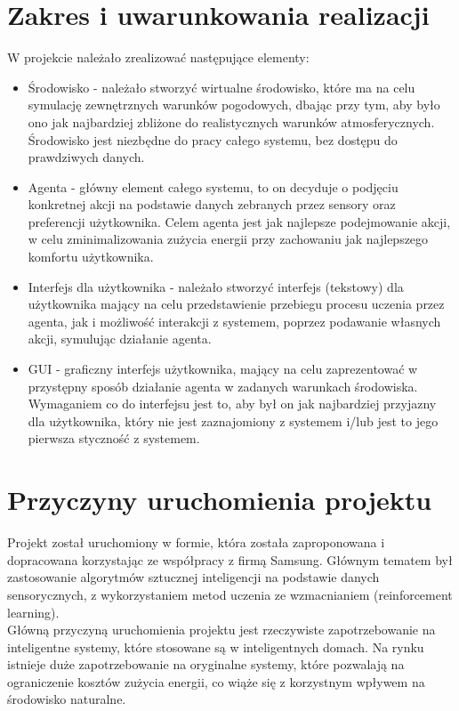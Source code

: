 \documentclass{article}
\begin{document}
\section{Zakres i uwarunkowania realizacji}
W projekcie należało zrealizować następujące elementy:
\begin{itemize}
\item Środowisko - należało stworzyć wirtualne środowisko, które ma na celu symulację zewnętrznych warunków pogodowych, dbając przy tym, aby było ono jak najbardziej zbliżone do realistycznych warunków atmosferycznych. Środowisko jest niezbędne do pracy całego systemu, bez dostępu do prawdziwych danych.
\item Agenta - główny element całego systemu, to on decyduje o podjęciu konkretnej akcji na podstawie danych zebranych przez sensory oraz preferencji użytkownika. Celem agenta jest jak najlepsze podejmowanie akcji, w celu zminimalizowania zużycia energii przy zachowaniu jak najlepszego komfortu użytkownika.
\item Interfejs dla użytkownika  - należało stworzyć interfejs (tekstowy) dla użytkownika mający na celu przedstawienie przebiegu procesu uczenia przez agenta, jak i możliwość interakcji z systemem, poprzez podawanie własnych akcji, symulując działanie agenta.
\item GUI - graficzny interfejs użytkownika, mający na celu zaprezentować w przystępny sposób działanie agenta w zadanych warunkach środowiska. Wymaganiem co do interfejsu jest to, aby był on jak najbardziej przyjazny dla użytkownika, który nie jest zaznajomiony z systemem i/lub jest to jego pierwsza styczność z systemem.
\end{itemize}

\section{Przyczyny uruchomienia projektu}

Projekt został uruchomiony w formie, która została zaproponowana i dopracowana korzystając ze współpracy z firmą Samsung. Głównym tematem był zastosowanie algorytmów sztucznej inteligencji na podstawie danych sensorycznych, z wykorzystaniem metod uczenia ze wzmacnianiem (reinforcement learning). \\
Główną przyczyną uruchomienia projektu jest rzeczywiste zapotrzebowanie na inteligentne systemy, które stosowane są w inteligentnych domach. Na rynku istnieje duże zapotrzebowanie na oryginalne systemy, które pozwalają na ograniczenie kosztów zużycia energii, co wiąże się  z korzystnym wpływem na środowisko naturalne.
\end{document}
